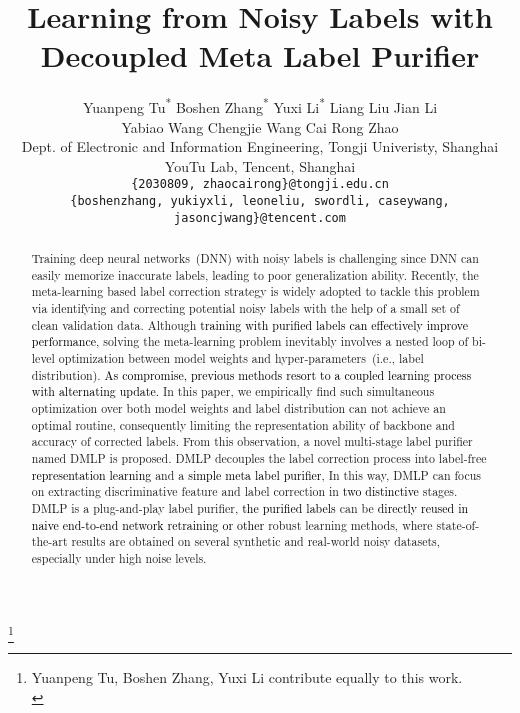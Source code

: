 \documentclass[10pt,twocolumn,letterpaper]{article}
\newcommand{\lyx}[1]{\textcolor{black}{#1}}
\begin{document}
\title{Learning from Noisy Labels with Decoupled Meta Label Purifier}







\author{Yuanpeng Tu\textsuperscript{*} \quad Boshen Zhang\textsuperscript{*} \quad Yuxi Li\textsuperscript{*} \quad Liang Liu \quad Jian Li \\ Yabiao Wang \quad  Chengjie Wang \quad Cai Rong Zhao\\
	Dept. of Electronic and Information Engineering, Tongji Univeristy, Shanghai \\ YouTu Lab, Tencent, Shanghai \\
{\tt\small \{2030809, zhaocairong\}@tongji.edu.cn}\\
	{\tt\small \{boshenzhang, yukiyxli, leoneliu, swordli, caseywang, jasoncjwang\}@tencent.com}}


\maketitle

\footnote{ Yuanpeng Tu, Boshen Zhang, Yuxi Li contribute equally to this work.\\}



\newcommand{\fix}{\marginpar{FIX}}
\newcommand{\new}{\marginpar{NEW}}





\begin{abstract}
Training deep neural networks~(DNN) with noisy labels is challenging since DNN can easily memorize inaccurate labels, leading to poor generalization ability. Recently, the meta-learning based label correction strategy is widely adopted to tackle this problem via identifying and correcting potential noisy labels with the help of a small set of clean validation data. Although \lyx{training with purified labels can effectively improve performance}, solving the meta-learning problem inevitably involves a nested loop of bi-level optimization between model weights and hyper-parameters~(i.e., label distribution). \lyx{As compromise, previous methods resort to a coupled learning process with alternating update.} In this paper, we empirically find such simultaneous optimization over both model weights and label distribution can not achieve an optimal routine, consequently limiting the representation ability of backbone and accuracy of corrected labels. From this observation, a novel multi-stage label purifier named DMLP is proposed. DMLP decouples the label correction process into label-free \lyx{representation learning} and a \lyx{simple meta label purifier}, In this way, DMLP can focus on extracting discriminative feature and label correction in \lyx{two distinctive} stages. DMLP is a plug-and-play label purifier, \lyx{the purified labels} can be \lyx{directly reused in naive end-to-end network retraining or other} robust learning methods, where state-of-the-art results are obtained on several synthetic and real-world noisy datasets, especially under high noise levels.
\end{abstract}
\end{document}
